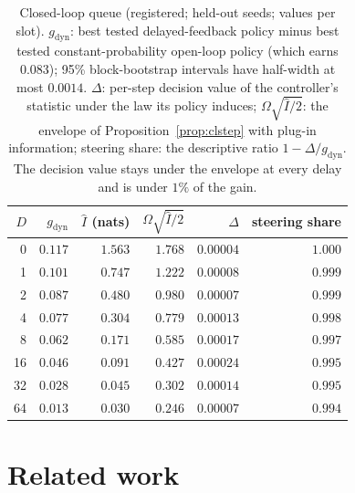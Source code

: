 \documentclass[acmsmall,screen,review,anonymous]{acmart}
\begin{document}
\begin{table}[h]\centering\footnotesize
\begin{tabular}{rrrrrr}
\toprule
$D$ & $g_{\mathrm{dyn}}$ & $\hat I$ (nats) & $\Omega\sqrt{\hat I/2}$ & $\Delta$ & steering share \\
\midrule
0 & $0.117$ & $1.563$ & $1.768$ & $0.00004$ & $1.000$ \\
1 & $0.101$ & $0.747$ & $1.222$ & $0.00008$ & $0.999$ \\
2 & $0.087$ & $0.480$ & $0.980$ & $0.00007$ & $0.999$ \\
4 & $0.077$ & $0.304$ & $0.779$ & $0.00013$ & $0.998$ \\
8 & $0.062$ & $0.171$ & $0.585$ & $0.00017$ & $0.997$ \\
16 & $0.046$ & $0.091$ & $0.427$ & $0.00024$ & $0.995$ \\
32 & $0.028$ & $0.045$ & $0.302$ & $0.00014$ & $0.995$ \\
64 & $0.013$ & $0.030$ & $0.246$ & $0.00007$ & $0.994$ \\
\bottomrule
\end{tabular}
\caption{Closed-loop queue (registered; held-out seeds; values per slot).
$g_{\mathrm{dyn}}$: best tested delayed-feedback policy minus best tested
constant-probability open-loop policy (which earns $0.083$); 95\% block-bootstrap intervals have half-width
at most $0.0014$. $\Delta$: per-step decision value of the controller's
statistic under the law its policy induces; $\Omega\sqrt{\hat I/2}$: the
envelope of Proposition~\ref{prop:clstep} with plug-in information;
steering share: the descriptive ratio $1-\Delta/g_{\mathrm{dyn}}$. The
decision value stays under the envelope at every delay and is under
$1\%$ of the gain.}
\label{tab:queue}
\end{table}

\section{Related work}\label{sec:related}
\end{document}
